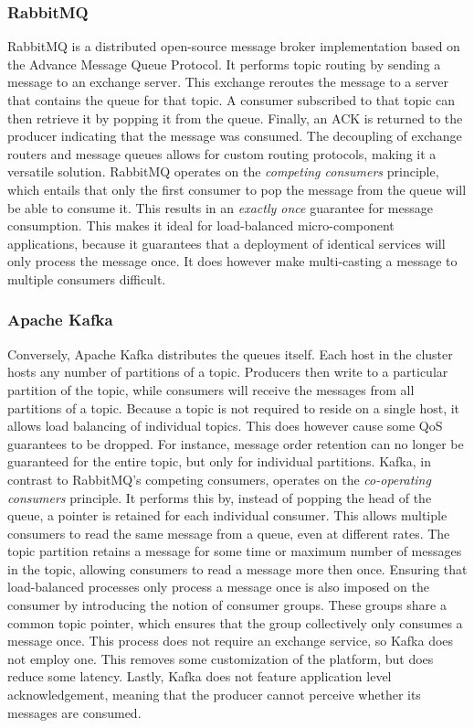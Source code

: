 \subsubsection*{RabbitMQ}
RabbitMQ \cite{web:rabbitmq} is a distributed open-source message broker implementation based on the Advance Message Queue Protocol. It performs topic routing by sending a message to an exchange server. This exchange reroutes the message to a server that contains the queue for that topic. A consumer subscribed to that topic can then retrieve it by popping it from the queue. Finally, an ACK is returned to the producer indicating that the message was consumed. The decoupling of exchange routers and message queues allows for custom routing protocols, making it a versatile solution. RabbitMQ operates on the \emph{competing consumers} principle, which entails that only the first consumer to pop the message from the queue will be able to consume it. This results in an \emph{exactly once} guarantee for message consumption. This makes it ideal for load-balanced micro-component applications, because it guarantees that a deployment of identical services will only process the message once. It does however make multi-casting a message to multiple consumers difficult.

\subsubsection*{Apache Kafka}
Conversely, Apache Kafka \cite{web:kafka} distributes the queues itself. Each host in the cluster hosts any number of partitions of a topic. Producers then write to a particular partition of the topic, while consumers will receive the messages from all partitions of a topic. Because a topic is not required to reside on a single host, it allows load balancing of individual topics. This does however cause some QoS guarantees to be dropped. For instance, message order retention can no longer be guaranteed for the entire topic, but only for individual partitions. Kafka, in contrast to RabbitMQ's competing consumers, operates on the \emph{co-operating consumers} principle. It performs this by, instead of popping the head of the queue, a pointer is retained for each individual consumer. This allows multiple consumers to read the same message from a queue, even at different rates. The topic partition retains a message for some time or maximum number of messages in the topic, allowing consumers to read a message more then once. Ensuring that load-balanced processes only process a message once is also imposed on the consumer by introducing the notion of consumer groups. These groups share a common topic pointer, which ensures that the group collectively only consumes a message once. This process does not require an exchange service, so Kafka does not employ one. This removes some customization of the platform, but does reduce some latency. Lastly, Kafka does not feature application level acknowledgement, meaning that the producer cannot perceive whether its messages are consumed.

